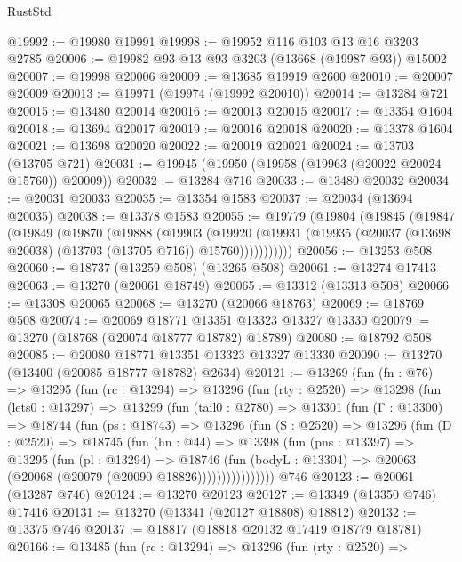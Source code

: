 \begin{lexlean}{RustStd}
\begin{coremodule}
@19992 := @19980 @19991
@19998 := @19952 @116 @103 @13 @16 @3203 @2785
@20006 := @19982 @93 @13 @93 @3203 (@13668 (@19987 @93)) @15002
@20007 := @19998 @20006
@20009 := @13685 @19919 @2600
@20010 := @20007 @20009
@20013 := @19971 (@19974 (@19992 @20010))
@20014 := @13284 @721
@20015 := @13480 @20014
@20016 := @20013 @20015
@20017 := @13354 @1604
@20018 := @13694 @20017
@20019 := @20016 @20018
@20020 := @13378 @1604
@20021 := @13698 @20020
@20022 := @20019 @20021
@20024 := @13703 (@13705 @721)
@20031 := @19945 (@19950 (@19958 (@19963 (@20022 @20024 @15760)) @20009))
@20032 := @13284 @716
@20033 := @13480 @20032
@20034 := @20031 @20033
@20035 := @13354 @1583
@20037 := @20034 (@13694 @20035)
@20038 := @13378 @1583
@20055 := @19779
    (@19804
      (@19845
        (@19847
          (@19849
            (@19870
              (@19888
                (@19903
                  (@19920
                    (@19931 (@19935 (@20037 (@13698 @20038) (@13703 (@13705 @716)) @15760)))))))))))
@20056 := @13253 @508
@20060 := @18737 (@13259 @508) (@13265 @508)
@20061 := @13274 @17413
@20063 := @13270 (@20061 @18749)
@20065 := @13312 (@13313 @508)
@20066 := @13308 @20065
@20068 := @13270 (@20066 @18763)
@20069 := @18769 @508
@20074 := @20069 @18771 @13351 @13323 @13327 @13330
@20079 := @13270 (@18768 (@20074 @18777 @18782) @18789)
@20080 := @18792 @508
@20085 := @20080 @18771 @13351 @13323 @13327 @13330
@20090 := @13270 (@13400 (@20085 @18777 @18782) @2634)
@20121 := @13269
    (fun (fn : @76) =>
    @13295
      (fun (rc : @13294) =>
      @13296
        (fun (rty : @2520) =>
        @13298
          (fun (lets0 : @13297) =>
          @13299
            (fun (tail0 : @2780) =>
            @13301
              (fun (Γ : @13300) =>
              @18744
                (fun (ps : @18743) =>
                @13296
                  (fun (S : @2520) =>
                  @13296
                    (fun (D : @2520) =>
                    @18745
                      (fun (hn : @44) =>
                      @13398
                        (fun (pns : @13397) =>
                        @13295
                          (fun (pl : @13294) =>
                          @18746
                            (fun (bodyL : @13304) =>
                            @20063 (@20068 (@20079 (@20090 @18826))))))))))))))))
    @746
@20123 := @20061 (@13287 @746)
@20124 := @13270 @20123
@20127 := @13349 (@13350 @746) @17416
@20131 := @13270 (@13341 (@20127 @18808) @18812)
@20132 := @13375 @746
@20137 := @18817 (@18818 @20132 @17419 @18779 @18781)
@20166 := @13485
    (fun (rc : @13294) =>
    @13296
      (fun (rty : @2520) =>

\end{coremodule}
\end{lexlean}
